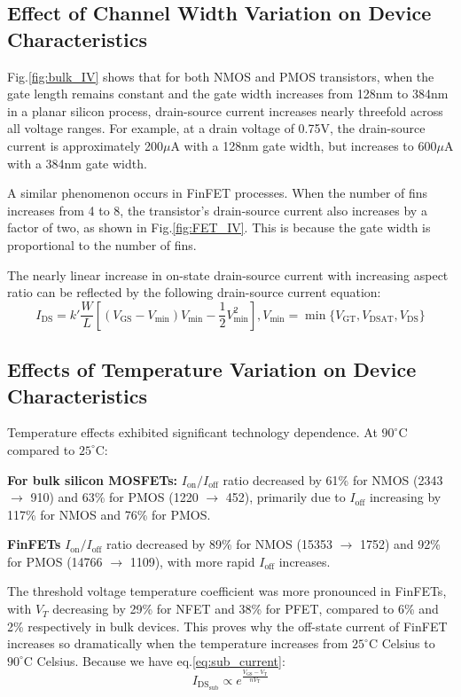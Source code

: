 \documentclass[UTF8,12pt,a4paper]{article}
\begin{document}
\subsection{Effect of Channel Width Variation on Device Characteristics}
Fig.\ref{fig:bulk_IV} shows that for both NMOS and PMOS transistors, when the gate length remains constant and the gate width increases from 128nm to 384nm in a planar silicon process, drain-source current increases nearly threefold across all voltage ranges. For example, at a drain voltage of 0.75V, the drain-source current is approximately 200$\mu$A with a 128nm gate width, but increases to 600$\mu$A with a 384nm gate width.

A similar phenomenon occurs in FinFET processes. When the number of fins increases from 4 to 8, the transistor's drain-source current also increases by a factor of two, as shown in Fig.\ref{fig:FET_IV}. This is because the gate width is proportional to the number of fins.

The nearly linear increase in on-state drain-source current with increasing aspect ratio can be reflected by the following drain-source current equation:
\begin{equation}
    I_{\text{DS}} = k'\frac{W}{L}[(V_{\text{GS}}-V_{\text{min}})V_{\text{min}}-\frac{1}{2}V_{\text{min}}^2], V_{\text{min}}=\min\{V_{\text{GT}}, V_{\text{DSAT}}, V_{\text{DS}}\}
    \label{leakage_equation}
\end{equation}

\subsection{Effects of Temperature Variation on Device Characteristics}
Temperature effects exhibited significant technology dependence. At $90^\circ$C compared to $25^\circ$C:

\textbf{For bulk silicon MOSFETs:} 
$I_{\text{on}}/I_{\text{off}}$ ratio decreased by 61\% for NMOS (2343 $\rightarrow$ 910) and 63\% for PMOS (1220 $\rightarrow$ 452), primarily due to $I_{\text{off}}$ increasing by 117\% for NMOS and 76\% for PMOS.

\textbf{FinFETs} 
$I_{\text{on}}/I_{\text{off}}$ ratio decreased by 89\% for NMOS (15353 $\rightarrow$ 1752) and 92\% for PMOS (14766 $\rightarrow$ 1109), with more rapid $I_{\text{off}}$ increases.

The threshold voltage temperature coefficient was more pronounced in FinFETs, with $V_T$ decreasing by 29\% for NFET and 38\% for PFET, compared to 6\% and 2\% respectively in bulk devices. This proves why the off-state current of FinFET increases so dramatically when the temperature increases from $25^\circ$C Celsius to $90^\circ$C Celsius. Because we have eq.\ref{eq:sub_current}:
\begin{equation}
    I_{\text{DS}_\text{sub}}\propto e^{\frac{V_{\text{GS}}-V_{\text{T}}}{nV_{\text{T}}}}
    \label{eq:sub_current}
\end{equation}
\end{document}
